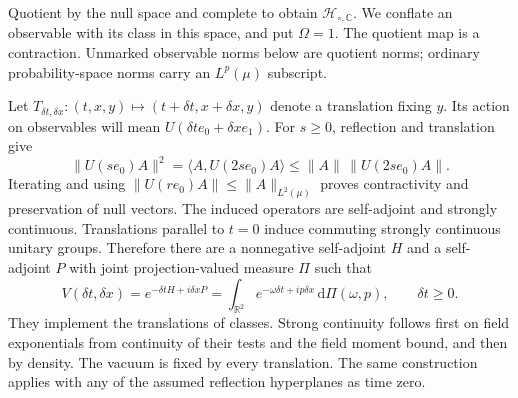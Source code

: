 \documentclass[11pt, letterpaper, reqno]{amsart}
\theoremstyle{definition}
\theoremstyle{remark}
\newcommand{\bbC}{\mathbb{C}}
\newcommand{\bbR}{\mathbb{R}}
\newcommand{\calH}{\mathcal{H}}
\newcommand{\dd}{\,\mathrm{d}}
\begin{document}
Quotient by the null space and complete to obtain $\calH_{\circ,\bbC}$.
We conflate an observable with its class in this space, and put $\Omega=1$.
The quotient map is a contraction. Unmarked observable norms below are quotient
norms; ordinary probability-space norms carry an $L^p(\mu)$ subscript.

Let $T_{\delta t,\delta x}:(t,x,y)\mapsto
(t+\delta t,x+\delta x,y)$ denote a translation fixing $y$.
Its action on observables will mean $U(\delta t e_0+\delta x e_1)$.
For $s\geq0$, reflection and translation give
\begin{equation}
 \|U(se_0)A\|^2=\langle A,U(2se_0)A\rangle
 \leq\|A\|\,\|U(2se_0)A\|.
\end{equation}
Iterating and using $\|U(re_0)A\|\leq\|A\|_{L^2(\mu)}$ proves
contractivity and preservation of null vectors. The induced operators
are self-adjoint and strongly continuous. Translations parallel to
$t=0$ induce commuting strongly continuous unitary groups. Therefore
there are a nonnegative self-adjoint $H$ and a self-adjoint $P$ with
joint projection-valued measure $\Pi$ such that
\begin{equation}\label{eq:spectral-translations}
 V(\delta t,\delta x)=e^{-\delta tH+i\delta xP}
 =\int_{\bbR^2}e^{-\omega\delta t+ip\delta x}\dd\Pi(\omega,p),
 \qquad\delta t\geq0.
\end{equation}
They implement the translations of classes. Strong continuity follows
first on field exponentials from continuity of their tests and the
field moment bound, and then by density. The vacuum is fixed by every
translation. The same construction applies with any of the assumed
reflection hyperplanes as time zero.
\end{document}
